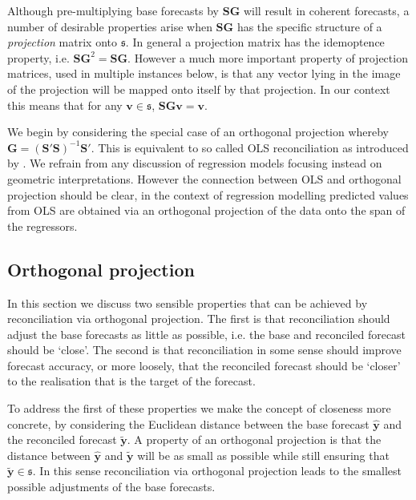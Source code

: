 \documentclass[12pt]{article}
\theoremstyle{definition}
\theoremstyle{property}
\begin{document}
	Although pre-multiplying base forecasts by $\bm{SG}$ will result in coherent forecasts, a number of desirable properties arise when $\bm{SG}$ has the specific structure of a {\em projection} matrix onto $\mathfrak{s}$.  In general a projection matrix has the idemoptence property, i.e. $\bm{SG}^2=\bm{SG}$.  However a much more important property of projection matrices, used in multiple instances below, is that any vector lying in the image of the projection will be mapped onto itself by that projection.   In our context this means that for any $\bm{v}\in\mathfrak{s}$, $\bm{SGv}=\bm{v}$.
	
	We begin by considering the special case of an orthogonal projection whereby $\bm{G}=\left(\bm{S}'\bm{S}\right)^{-1}\bm{S}'$.  This is equivalent to so called OLS reconciliation as introduced by \cite{Hyndman2011}.  We refrain from any discussion of regression models focusing instead on geometric interpretations.  However the connection between OLS and orthogonal projection should be clear, in the context of regression modelling predicted values from OLS are obtained via an orthogonal projection of the data onto the span of the regressors.
	
	\subsection{Orthogonal projection}
	
	In this section we discuss two sensible properties that can be achieved by reconciliation via orthogonal projection.  The  first is that reconciliation should adjust the base forecasts as little as possible, i.e. the base and reconciled forecast should be `close'.  The second is that reconciliation in some sense should improve forecast accuracy, or more loosely, that the reconciled forecast should be `closer' to the realisation that is the target of the forecast.  
	
	To address the first of these properties we make the concept of closeness more concrete, by considering the Euclidean distance between the base forecast $\hat{\bm{y}}$ and the reconciled forecast  $\tilde{\bm{y}}$.  A property of an orthogonal projection is that the distance between $\hat{\bm{y}}$ and $\tilde{\bm{y}}$ will be as small as possible while still ensuring that $\tilde{\bm{y}}\in\mathfrak{s}$.  In this sense reconciliation via orthogonal projection leads to the smallest possible adjustments of the base forecasts.
	
\end{document}
